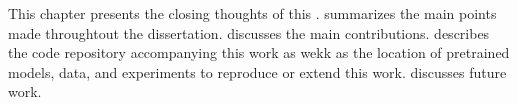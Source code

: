 
This chapter presents the closing thoughts of this
\thesisdiss{}.  summarizes
the main points made throughtout the dissertation.
 discusses the main
contributions. 
describes the code repository accompanying this work as wekk
as the location of pretrained models, data, and experiments
to reproduce or extend this work. 
discusses future work.
